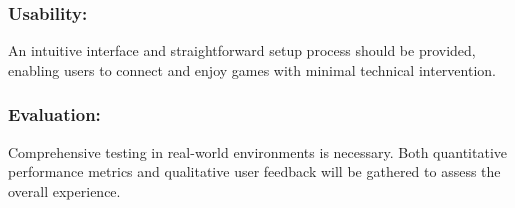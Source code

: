 \subsubsection{Usability:}
	      An intuitive interface and straightforward setup process should be provided, enabling users to connect and enjoy games with minimal technical intervention.

\subsubsection{Evaluation:}
	      Comprehensive testing in real-world environments is necessary. Both quantitative performance metrics and qualitative user feedback will be gathered to assess the overall experience.


